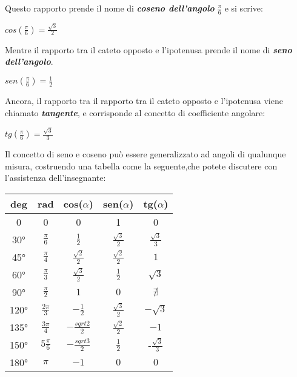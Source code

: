 Questo rapporto prende il nome di {\bf \slshape coseno dell'angolo} $\frac \pi 6$ e si scrive:
\begin{center}
\begin{math}
cos(\frac \pi 6) = \frac {\sqrt 3} 2
\end{math}
\end{center}
Mentre il rapporto tra il cateto opposto e l'ipotenusa prende il nome di {\bfseries \slshape seno dell'angolo}.
\begin{center}
\begin{math}
sen(\frac \pi 6) = \frac 1 2
\end{math}
\end{center}
Ancora, il rapporto tra il rapporto tra il cateto opposto e l'ipotenusa viene chiamato {\bf \slshape tangente}, e corrisponde al concetto di coefficiente angolare:
\begin{center}
\begin{math}
tg(\frac \pi 6) = \frac {\sqrt 3} 3
\end{math}
\end{center}
Il concetto di seno e coseno può essere generalizzato ad angoli di qualunque misura, costruendo una tabella come la seguente,che potete discutere con l'assistenza dell'insegnante:\newline
\begin{center}
\begin{tabular}{|c|c|c|c|c|}
\hline
deg & rad & cos($\alpha$) & sen($\alpha$) & tg($\alpha$) \\
\hline
0 & 0 & 0 & 1 & 0 \\
\hline
30° & $\frac \pi 6$ & $\frac 1 2$ & $\frac {\sqrt 3} 2$ & $\frac {\sqrt 3} 3$ \\
\hline
45° & $\frac \pi 4$ & $\frac {\sqrt 2} 2$ & $\frac {\sqrt 2} 2$ & $1$ \\
\hline
60° & $\frac \pi 3$ & $\frac {\sqrt 3} 2$ & $\frac 1 2$ & $\sqrt 3$ \\
\hline
90° & $\frac \pi 2$ & $1$ & $0$ & $\nexists$ \\
\hline
120° & $\frac {2 \pi} 3$ & $-\frac 1 2$ & $\frac {\sqrt 3} {2}$ & $-\sqrt 3$ \\
\hline
135° & $\frac {3 \pi} 4$ & $-\frac {sqrt 2} 2$ & $\frac {\sqrt 2} {2}$ & $-1$ \\
\hline
150° & $5 \frac \pi 6$ & $-\frac {sqrt 3} 2$ & $\frac 1 2$ & -$\frac {\sqrt 3} {3}$ \\
\hline
180° & $\pi $ & $-1$ & $0$ & $0$ \\
\hline
\end{tabular}
\end{center}
